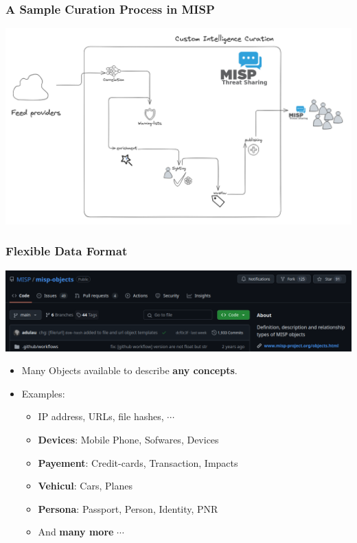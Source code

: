 \begin{frame}
    \frametitle{A Sample Curation Process in MISP}
    \begin{center}
        \includegraphics[width=0.84\linewidth]{curation.png}
    \end{center}
\end{frame}

\begin{frame}
    \frametitle{Flexible Data Format}
    \begin{center}
        \includegraphics[width=0.99\linewidth]{misp-objects-repo.png}
    \end{center}
    \begin{itemize}
        \item Many Objects available to describe \textbf{any concepts}.
        \item Examples:
        \begin{itemize}
            \item IP address, URLs, file hashes, $\cdots$ 
            \item \textbf{Devices}: Mobile Phone, Sofwares, Devices
            \item \textbf{Payement}: Credit-cards, Transaction, Impacts
            \item \textbf{Vehicul}: Cars, Planes
            \item \textbf{Persona}: Passport, Person, Identity, PNR
            \item And \textbf{many more} $\cdots$
        \end{itemize}
    \end{itemize}
\end{frame}

